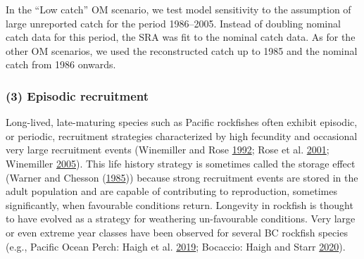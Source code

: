 \documentclass[11pt]{book}
\begin{document}
In the ``Low catch'' OM scenario, we test model sensitivity to the assumption of large unreported catch for the period 1986--2005. Instead of doubling nominal catch data for this period, the SRA was fit to the nominal catch data. As for the other OM scenarios, we used the reconstructed catch up to 1985 and the nominal catch from 1986 onwards.

\hypertarget{sec:approach3-reference3}{%
\subsubsection{(3) Episodic recruitment}\label{sec:approach3-reference3}}

Long-lived, late-maturing species such as Pacific rockfishes often exhibit episodic, or periodic, recruitment strategies characterized by high fecundity and occasional very large recruitment events (Winemiller and Rose \protect\hyperlink{ref-winemiller1992}{1992}; Rose et al. \protect\hyperlink{ref-rose2001}{2001}; Winemiller \protect\hyperlink{ref-winemiller2005}{2005}). This life history strategy is sometimes called the storage effect (Warner and Chesson (\protect\hyperlink{ref-warner1985}{1985})) because strong recruitment events are stored in the adult population and are capable of contributing to reproduction, sometimes significantly, when favourable conditions return. Longevity in rockfish is thought to have evolved as a strategy for weathering un-favourable conditions. Very large or even extreme year classes have been observed for several BC rockfish species (e.g., Pacific Ocean Perch: Haigh et al. \protect\hyperlink{ref-haigh2019}{2019}; Bocaccio: Haigh and Starr \protect\hyperlink{ref-haigh2020}{2020}).
\end{document}
